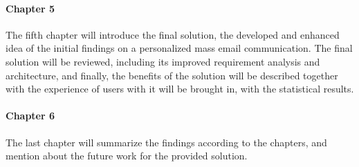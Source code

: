 \paragraph{Chapter 5} The fifth chapter will introduce the final solution, the developed and enhanced idea of the initial findings on a personalized mass email communication. The final solution will be reviewed, including its improved requirement analysis and architecture, and finally, the benefits of the solution will be described together with the experience of users with it will be brought in, with the statistical results.

\paragraph{Chapter 6} The last chapter will summarize the findings according to the chapters, and mention about the future work for the provided solution.

